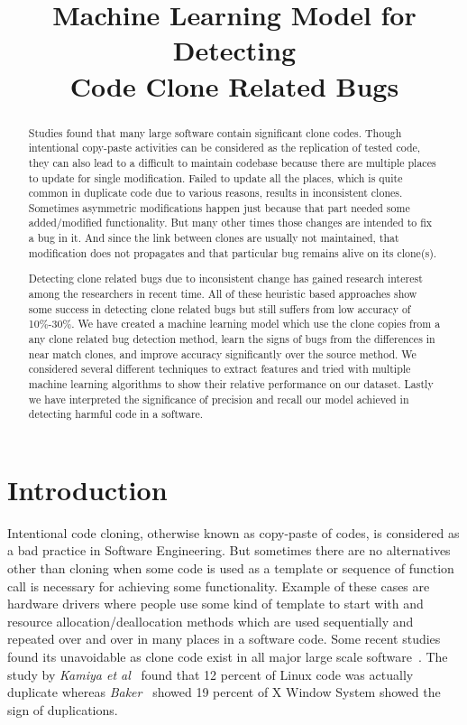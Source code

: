 \documentclass[nocopyrightspace]{sigplanconf}
\title{Machine Learning Model for Detecting \\Code Clone Related Bugs}
\date{}
\begin{document}
\maketitle

\begin{abstract}
Studies found that many large software contain significant clone codes. Though intentional copy-paste activities can be considered as the replication of tested code, they can also lead to a difficult to maintain codebase because there are multiple places to update for single modification. Failed to update all the places, which is quite common in duplicate code due to various reasons, results in inconsistent clones. Sometimes asymmetric modifications happen just because that part needed some added/modified functionality. But many other times those changes are intended to fix a bug in it. And since the link between clones are usually not maintained, that modification does not propagates and that particular bug remains alive on its clone(s).

Detecting clone related bugs due to inconsistent change has gained research interest among the researchers in recent time. All of these heuristic based approaches show some success in detecting clone related bugs but still suffers from low accuracy of 10\%-30\%. We have created a machine learning model which use the clone copies from a any clone related bug detection method, learn the signs of bugs from the differences in near match clones, and improve accuracy significantly over the source method. We considered several different techniques to extract features and tried with multiple machine learning algorithms to show their relative performance on our dataset. Lastly we have interpreted the significance of precision and recall our model achieved in detecting harmful code in a software.
\end{abstract}
			
\section{Introduction}
Intentional code cloning, otherwise known as copy-paste of codes, is considered as a bad practice in Software Engineering. But sometimes there are no alternatives other than cloning when some code is used as a template or sequence of function call is necessary for achieving some functionality. Example of these cases are hardware drivers where people use some kind of template to start with and resource allocation/deallocation methods which are used sequentially and repeated over and over in many places in a software code. Some recent studies found its unavoidable as clone code exist in all major large scale software~\cite{Li2006,Kamiya2002,Baker1995}. The study by \emph{Kamiya et al}~\cite{Kamiya2002} found that 12 percent of Linux code was actually duplicate whereas \emph{Baker}~\cite{Baker1995} showed 19 percent of X Window System showed the sign of duplications.
\end{document}
